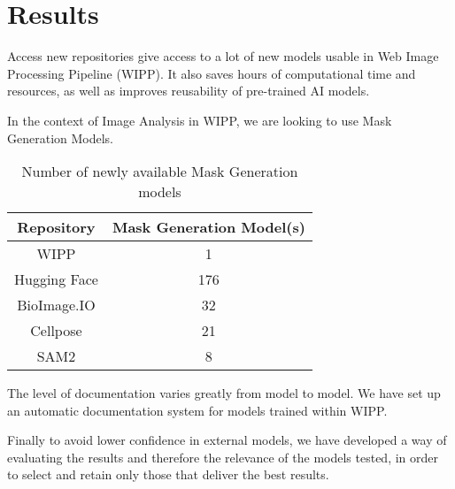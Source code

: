 \section{Results}
\label{sec:results}

Access new repositories give access to a lot of new models usable in Web Image
Processing Pipeline (WIPP). It also saves hours of computational time and
resources, as well as improves reusability of pre-trained AI models.

In the context of Image Analysis in WIPP, we are looking to use Mask
Generation Models.

\begin{table}[H]
\centering
\caption{\label{tab:number_of_newly_available_models}%
  Number of newly available Mask Generation models
}
\begin{tabular}{cc}
  \toprule
  Repository & Mask Generation Model(s) \\
  \midrule
  WIPP & 1 \\
  Hugging Face & 176 \\
  BioImage.IO & 32 \\
  Cellpose & 21 \\
  SAM2 & 8 \\
  \bottomrule
\end{tabular}
\end{table}

The level of documentation varies greatly from model to model. We have set up an
automatic documentation system for models trained within WIPP.

Finally to avoid lower confidence in external models, we have developed a way of
evaluating the results and therefore the relevance of the models tested, in
order to select and retain only those that deliver the best results.

